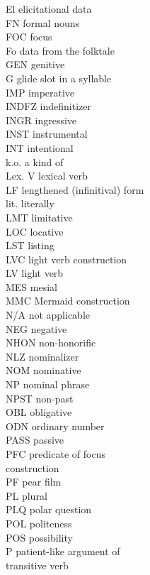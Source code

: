 \begin{multicols}{2}
\begin{tabbing}
El \>  elicitational data \\
FN \>  formal nouns \\
FOC \>  focus \\
Fo \>  data from the folktale \\
GEN \>  genitive \\
G \>  glide slot in a syllable \\
IMP \>  imperative \\
INDFZ \>  indefinitizer \\
INGR \>  ingressive \\
INST \>  instrumental \\
INT \>  intentional \\
k.o. \>  a kind of \\
Lex. V \>  lexical verb \\
LF \>  lengthened (infinitival) form \\
lit. \>  literally \\
LMT \>  limitative \\
LOC \>  locative \\
LST \>  listing \\
LVC \>  light verb construction \\
LV \>  light verb \\
MES \>  mesial \\
MMC \>  Mermaid construction \\
N/A \>  not applicable \\
NEG \>  negative \\
NHON \>  non-honorific \\
NLZ \>  nominalizer \\
NOM \>  nominative \\
NP \>  nominal phrase \\
NPST \>  non-past \\
OBL \>  obligative \\
ODN \>  ordinary number \\
PASS \>  passive \\
PFC \>  predicate of focus \\ \> construction \\
PF \>  pear film \\
PL \>  plural\\
PLQ \>  polar question\\
POL \>  politeness\\
POS \>  possibility\\
P \>  patient-like argument of \\ \> transitive verb \\

\end{tabbing}
\end{multicols}
